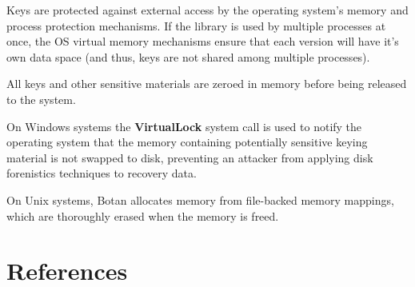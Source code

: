 \documentclass{article}
\newcommand{\function}[1]{\textbf{#1}}
\begin{document}
Keys are protected against external access by the operating system's memory and
process protection mechanisms. If the library is used by multiple processes at
once, the OS virtual memory mechanisms ensure that each version will have it's
own data space (and thus, keys are not shared among multiple processes).

All keys and other sensitive materials are zeroed in memory before being
released to the system.

On Windows systems the \function{VirtualLock} system call is used to notify the
operating system that the memory containing potentially sensitive keying
material is not swapped to disk, preventing an attacker from applying disk
forenistics techniques to recovery data.

On Unix systems, Botan allocates memory from file-backed memory mappings, which
are thoroughly erased when the memory is freed.

\section{References}
\end{document}

